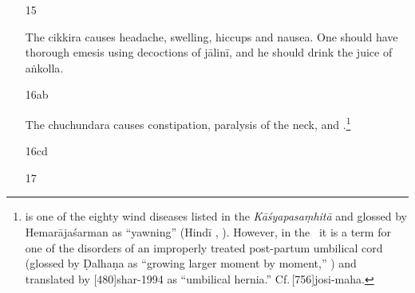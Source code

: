 \begin{translation}
\begin{itemize}
\item[15]

The \Gls{cikkira} causes headache, swelling, hiccups and nausea.  One
should have thorough emesis using
decoctions of \gls{jālinī}, and he should drink
the juice of \gls{aṅkolla}.

\item[16ab]

The \Gls{chuchundara} causes constipation, paralysis of the neck, and
.\footnote{ is one of the
    eighty wind diseases listed in the \emph{Kāśyapasaṃhitā} and glossed 
    by Hemarājaśarman as “yawning” (Hindī , 
    ). However, in
    the \CS\ it is a term for one of the disorders of an improperly
    treated post-partum umbilical cord (glossed by Ḍalhaṇa as 
    “growing larger moment by moment,” ) and 
    translated by [480]{shar-1994} as “umbilical hernia.”  
    Cf.\,[756]{josi-maha}.}
    
\item[16cd]
    
\item[17]

\end{itemize}

    \end{translation}
\endinput




%

